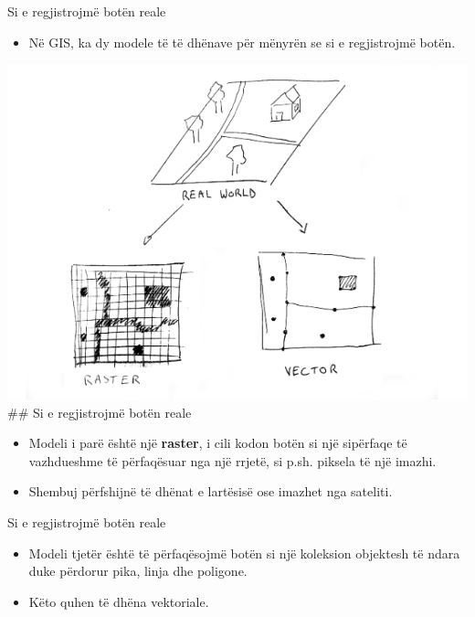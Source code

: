 \documentclass[
  ignorenonframetext,
]{beamer}
\providecommand{\tightlist}{%
  \setlength{\itemsep}{0pt}\setlength{\parskip}{0pt}}
\begin{document}
\begin{frame}{Si e regjistrojmë botën reale}
\protect\hypertarget{si-e-regjistrojmuxeb-botuxebn-reale}{}
\begin{itemize}
\tightlist
\item
  Në GIS, ka dy modele të të dhënave për mënyrën se si e regjistrojmë
  botën.
\end{itemize}

\includegraphics{./Figs/rasvec.png} \#\# Si e regjistrojmë botën reale

\begin{itemize}
\item
  Modeli i parë është një \textbf{raster}, i cili kodon botën si një
  sipërfaqe të vazhdueshme të përfaqësuar nga një rrjetë, si p.sh.
  piksela të një imazhi.
\item
  Shembuj përfshijnë të dhënat e lartësisë ose imazhet nga sateliti.
\end{itemize}
\end{frame}

\begin{frame}{Si e regjistrojmë botën reale}
\protect\hypertarget{si-e-regjistrojmuxeb-botuxebn-reale-1}{}
\begin{itemize}
\item
  Modeli tjetër është të përfaqësojmë botën si një koleksion objektesh
  të ndara duke përdorur pika, linja dhe poligone.
\item
  Këto quhen të dhëna vektoriale.
\end{itemize}
\end{frame}
\end{document}
